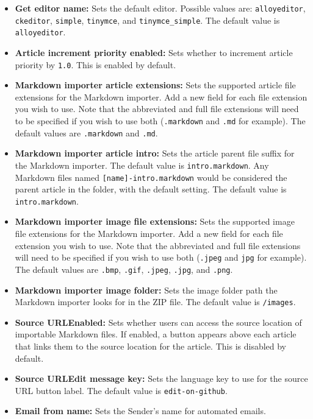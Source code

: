\begin{itemize}
\item
  \textbf{Get editor name:} Sets the default editor. Possible values
  are: \texttt{alloyeditor}, \texttt{ckeditor}, \texttt{simple},
  \texttt{tinymce}, and \texttt{tinymce\_simple}. The default value is
  \texttt{alloyeditor}.
\item
  \textbf{Article increment priority enabled:} Sets whether to increment
  article priority by \texttt{1.0}. This is enabled by default.
\item
  \textbf{Markdown importer article extensions:} Sets the supported
  article file extensions for the Markdown importer. Add a new field for
  each file extension you wish to use. Note that the abbreviated and
  full file extensions will need to be specified if you wish to use both
  (\texttt{.markdown} and \texttt{.md} for example). The default values
  are \texttt{.markdown} and \texttt{.md}.
\item
  \textbf{Markdown importer article intro:} Sets the article parent file
  suffix for the Markdown importer. The default value is
  \texttt{intro.markdown}. Any Markdown files named
  \texttt{{[}name{]}-intro.markdown} would be considered the parent
  article in the folder, with the default setting. The default value is
  \texttt{intro.markdown}.
\item
  \textbf{Markdown importer image file extensions:} Sets the supported
  image file extensions for the Markdown importer. Add a new field for
  each file extension you wish to use. Note that the abbreviated and
  full file extensions will need to be specified if you wish to use both
  (\texttt{.jpeg} and \texttt{jpg} for example). The default values are
  \texttt{.bmp}, \texttt{.gif}, \texttt{.jpeg}, \texttt{.jpg}, and
  \texttt{.png}.
\item
  \textbf{Markdown importer image folder:} Sets the image folder path
  the Markdown importer looks for in the ZIP file. The default value is
  \texttt{/images}.
\item
  \textbf{Source URLEnabled:} Sets whether users can access the source
  location of importable Markdown files. If enabled, a button appears
  above each article that links them to the source location for the
  article. This is disabled by default.
\item
  \textbf{Source URLEdit message key:} Sets the language key to use for
  the source URL button label. The default value is
  \texttt{edit-on-github}.
\item
  \textbf{Email from name:} Sets the Sender's name for automated emails.

\end{itemize}
